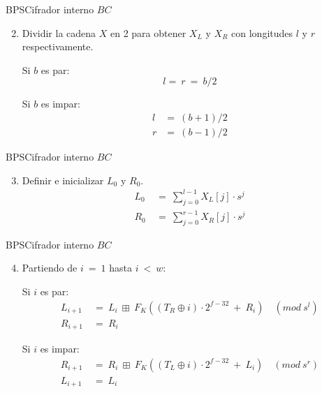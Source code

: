 \begin{frame}{BPS}{Cifrador interno $BC$}

  \begin{enumerate}
    \setcounter{enumi}{1}
    \item Dividir la cadena $X$ en 2 para obtener $X_L$ y $X_R$ con
      longitudes $l$ y $r$ respectivamente.

      Si $b$ es par:
      \begin{equation*}
        l =\: r\: =\: b/2
      \end{equation*}

      Si $b$ es impar:
      \begin{align*}
        l &=\: (b+1)/2 \\
        r &=\: (b-1)/2
      \end{align*}
  \end{enumerate}

\end{frame}

\begin{frame}{BPS}{Cifrador interno $BC$}

  \begin{enumerate}
    \setcounter{enumi}{2}
    \item Definir e inicializar $L_0$ y $R_0$.
      \begin{align*}
        L_0\: &=\: \sum_{j=0}^{l-1} X_L[j] \cdot s^j \\
        R_0\: &=\: \sum_{j=0}^{r-1} X_R[j] \cdot s^j
      \end{align*}
  \end{enumerate}

\end{frame}

\begin{frame}{BPS}{Cifrador interno $BC$}

  \begin{enumerate}
    \setcounter{enumi}{3}
    \item Partiendo de $i\: =\: 1$ hasta $i\: <\: w$:

      Si $i$ es par:
      \begin{align*}
        L_{i+1}\: &=\: L_i\: \boxplus\:
                      F_K((T_R \oplus i) \cdot 2^{f-32}\: +\: R_i)\quad
                      (mod\ s^l) \\
        R_{i+1}\: &=\: R_i
      \end{align*}

      Si $i$ es impar:
      \begin{align*}
        R_{i+1}\: &=\: R_i\: \boxplus\:
                      F_K((T_L \oplus i) \cdot 2^{f-32}\: +\: L_i)\quad
                      (mod\ s^r) \\
        L_{i+1}\: &=\: L_i
      \end{align*}
  \end{enumerate}

\end{frame}

